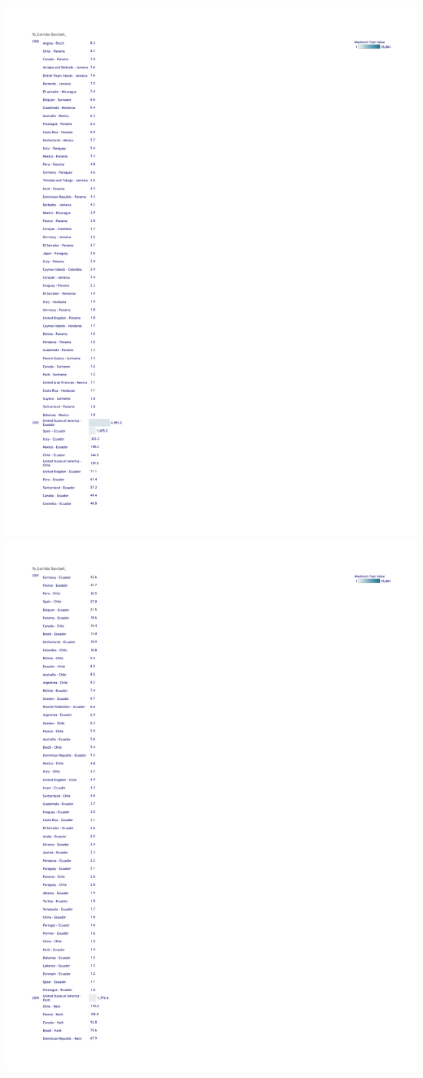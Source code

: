 \documentclass[
  11pt,
]{article}
\begin{document}
\includegraphics{data/Remittance_3/remitscope_page_38.png}
\includegraphics{data/Remittance_3/remitscope_page_39.png}
\end{document}
